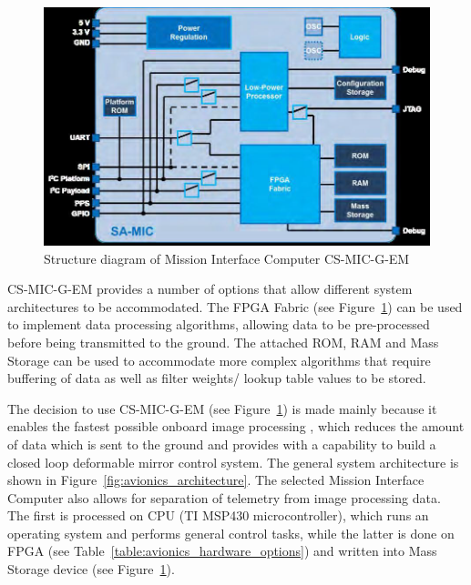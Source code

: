 \documentclass[12pt]{article}
\begin{document}
\begin{figure}[ht]
\centering
  \includegraphics[width=5in]{images/Avionics_fig1.png}
\caption{Structure diagram of Mission Interface Computer CS-MIC-G-EM  \cite{avionics_clyde_space}}
\label{fig:avionics_MIC}
\end{figure}

CS-MIC-G-EM provides a number of options that allow different system architectures to be accommodated. The FPGA Fabric (see Figure~\ref{fig:avionics_MIC}) can be used to implement data processing algorithms, allowing data to be pre-processed before being transmitted to the ground. The attached ROM, RAM and Mass Storage can be used to accommodate more complex algorithms that require buffering of data as well as filter weights/ lookup table values to be stored.

The decision to use CS-MIC-G-EM (see Figure~\ref{fig:avionics_MIC}) is made mainly because it enables the fastest possible onboard image processing \cite{avionics_FPGA}, which reduces the amount of data which is sent to the ground and provides with a capability to build a closed loop deformable mirror control system.
The general system architecture is shown in Figure~\ref{fig:avionics_architecture}. The selected Mission Interface Computer also allows for separation of telemetry from image processing data. The first is processed on CPU (TI MSP430 microcontroller), which runs an operating system and performs general control tasks, while the latter is done on FPGA (see Table~\ref{table:avionics_hardware_options}) and written into Mass Storage device (see Figure~\ref{fig:avionics_MIC}).
\end{document}
